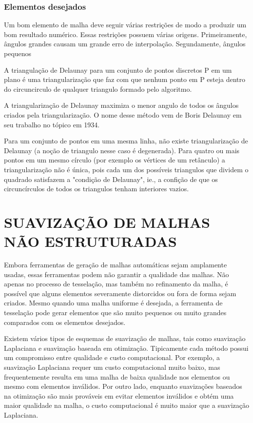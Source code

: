 \subsection{Elementos desejados}
Um bom elemento de malha deve seguir várias restrições de modo a produzir um bom resultado numérico. Essas restrições possuem várias origens. Primeiramente, ângulos grandes causam um grande erro de interpolação. Segundamente, ângulos pequenos 


A triangulação de Delaunay para um conjunto de pontos discretos P em um plano é uma triangularização que faz com que nenhum ponto em P esteja dentro do circuncirculo de qualquer triangulo formado pelo algoritmo.

A triangularização de Delaunay maximiza o menor angulo de todos os ângulos criados pela triangularização. O nome desse método vem de Boris Delaunay em seu trabalho no tópico em 1934.

Para um conjunto de pontos em uma mesma linha, não existe triangularização de Delaunay (a noção de triangulo nesse caso é degenerada). Para quatro ou mais pontos em um mesmo círculo (por exemplo os vértices de um retânculo) a triangularização não é única, pois cada um dos possíveis triangulos que dividem o quadrado satisfazem a "condição de Delaunay", ie., a confição de que os circuncírculos de todos os triangulos tenham interiores vazios.

\chapter[SUAVIZAÇÃO DE MALHAS NÃO ESTRUTURADAS]{SUAVIZAÇÃO DE MALHAS NÃO ESTRUTURADAS}

Embora ferramentas de geração de malhas automáticas sejam amplamente usadas, essas ferramentas podem não garantir a qualidade das malhas. Não apenas no processo de tesselação, mas também no refinamento da malha, é possível que alguns elementos severamente distorcidos ou fora de forma sejam criados. Mesmo quando uma malha uniforme é desejada, a ferramenta de tesselação pode gerar elementos que são muito pequenos ou muito grandes comparados com os elementos desejados. \cite{Zhou}

Existem vários tipos de esquemas de suavização de malhas, tais como suavização Laplaciana e suavização baseada em otimização. Tipicamente cada método possui um compromisso entre qualidade e custo computacional. Por exemplo, a suavização Laplaciana requer um custo computacional muito baixo, mas frequentemente resulta em uma malha de baixa qualidade nos elementos ou mesmo com elementos inválidos. Por outro lado, enquanto suavizações baseados na otimização são mais prováveis em evitar elementos inválidos e obtém uma maior qualidade na malha, o custo computacional é muito maior que a suavização Laplaciana. \cite{Zhou}

